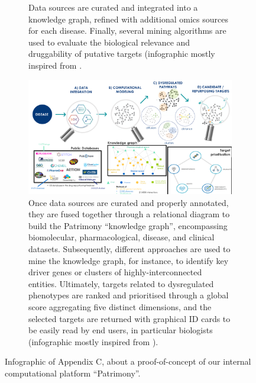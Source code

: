 {\begin{figure}
\begin{subfigure}[p]{0.95\textwidth}
         \caption[\textbf{Patrimony general framework}]{Data sources are curated and integrated into a knowledge graph, refined with additional omics sources for each disease. Finally, several mining algorithms are used to evaluate the biological relevance and druggability of putative targets (infographic mostly inspired from \autocite[Fig.1]{guedj_etal22}.}
         \label{subfig:patrimony-industrialisation}
     \end{subfigure}
     \begin{subfigure}[p]{0.95\textwidth}
         \centering
         \includegraphics[width=\textwidth]{figures/repurposing/patrimony_repositioning_platform.png}
         \caption[\textbf{Main steps of computational medicine, up to drug repurposing, integrated within the Patrimony platform}]{Once data sources are curated and properly annotated, they are fused together through a relational diagram to build the Patrimony \enquote{knowledge graph}, encompassing biomolecular, pharmacological, disease, and clinical datasets. Subsequently, different approaches are used to mine the knowledge graph, for instance, to identify key driver genes or clusters of highly-interconnected entities. Ultimately, targets related to dysregulated phenotypes are ranked and prioritised through a global score aggregating five distinct dimensions, and the selected targets are returned with graphical ID cards to be easily read by end users, in particular biologists (infographic mostly inspired from \autocite[Fig.2 and Fig.3]{guedj_etal22}).}
         \label{subfig:repositioning-platform}
     \end{subfigure}  
    \caption{Infographic of Appendix C, about a proof-of-concept of our internal computational platform \enquote{Patrimony}.}
    \label{fig:infographic-patrimony}
\end{figure}


}
